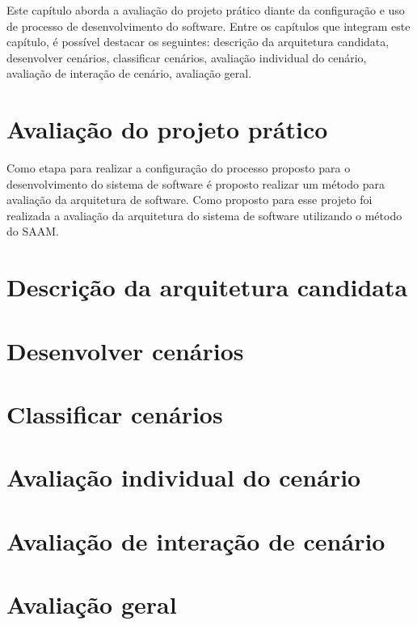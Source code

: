 Este capítulo aborda a avaliação do projeto prático diante da configuração e uso de processo de desenvolvimento do software. Entre os capítulos que integram este capítulo, é possível destacar os seguintes: descrição da arquitetura candidata, desenvolver cenários, classificar cenários, avaliação individual do cenário, avaliação de interação de cenário, avaliação geral.

\section{Avaliação do projeto prático}

Como etapa para realizar a configuração do processo proposto para o desenvolvimento do sistema de software é proposto realizar um método para avaliação da arquitetura de software. Como proposto para esse projeto foi realizada a avaliação da arquitetura do sistema de software utilizando o método do \acrfull{SAAM}.

\section{Descrição da arquitetura candidata}

\section{Desenvolver cenários}

\section{Classificar cenários}

\section{Avaliação individual do cenário}

\section{Avaliação de interação de cenário}

\section{Avaliação geral}
